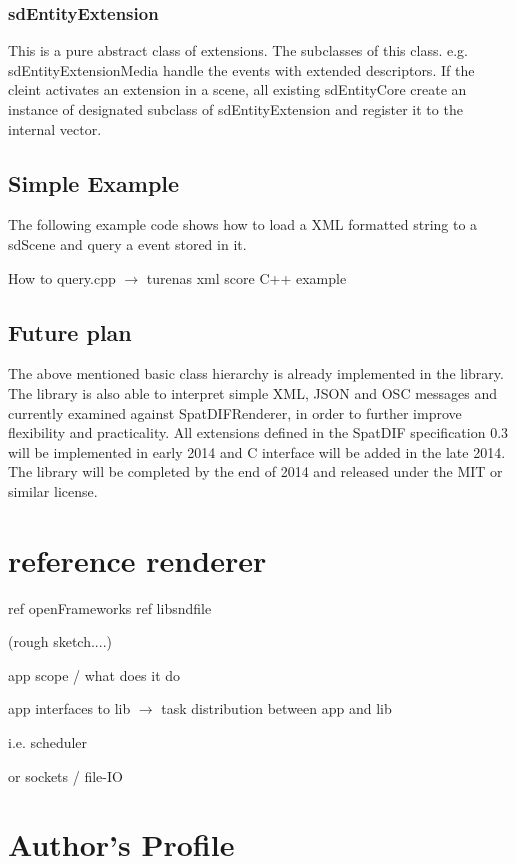 \documentclass{article}
\begin{document}
\subsubsection{sdEntityExtension}
This is a pure abstract class of extensions. The subclasses of this class. e.g. sdEntityExtensionMedia handle the events with extended descriptors. If the cleint activates an extension in a scene, all existing sdEntityCore create an instance of designated subclass of sdEntityExtension and register it to the internal vector.

\subsection{Simple Example}
The following example code shows how to load a XML formatted string to a sdScene and query a event stored in it.

How to query.cpp
$\rightarrow$ turenas xml score C++ example

\subsection{Future plan}

The above mentioned basic class hierarchy is already implemented in the library. The library is also able to interpret simple XML, JSON and OSC messages and currently examined against SpatDIFRenderer, in order to further improve flexibility and practicality.  All extensions defined in the SpatDIF specification 0.3 will be implemented in early 2014 and C interface will be added in the late 2014. The library will be completed by the end of 2014 and released under the MIT or similar license.

\section{reference renderer }%

ref openFrameworks
ref libsndfile


(rough sketch....)

app scope / what does it do

app interfaces to lib $\rightarrow$ task distribution between app and lib

i.e. scheduler

or sockets / file-IO

\printbibliography


\section{Author's Profile}
\end{document}
